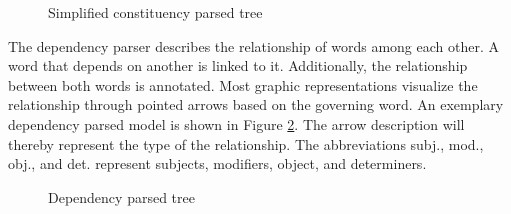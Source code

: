 \begin{figure}[h]
	\centering
	\caption{Simplified constituency parsed tree }
	\label{figure:constituencytree}
\end{figure}



The dependency parser describes the relationship of words among each other. A word that depends on another is linked to it. Additionally, the relationship between both words is annotated. Most graphic representations visualize the relationship through pointed arrows based on the governing word. An exemplary dependency parsed model is shown in Figure \ref{figure:dependencytree}. The arrow description will thereby represent the type of the relationship. The abbreviations subj., mod., obj., and det. represent subjects, modifiers, object, and determiners.


\begin{figure}[h]
	\centering
	\caption{Dependency parsed tree}
	\label{figure:dependencytree}
\end{figure}


